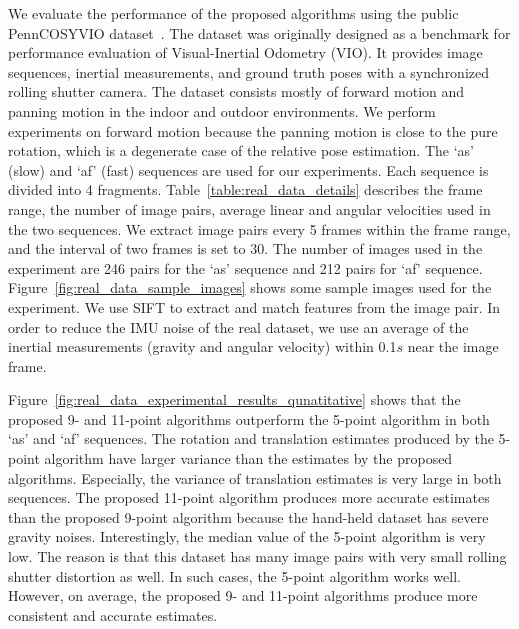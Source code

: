 \documentclass[10pt,twocolumn,letterpaper]{article}
\theoremstyle{definition}
\begin{document}
	
	
	We evaluate the performance of the proposed algorithms using the public PennCOSYVIO dataset~\cite{Pfrommer:ICRA:2017}.
	The dataset was originally designed as a benchmark for performance evaluation of Visual-Inertial Odometry (VIO). 
	It provides image sequences, inertial measurements, and ground truth poses with a synchronized rolling shutter camera.
	The dataset consists mostly of forward motion and panning motion in the indoor and outdoor environments. 
	We perform experiments on forward motion because the panning motion is close to the pure rotation, which is a degenerate case of the relative pose estimation.
	The `as' (slow) and `af' (fast) sequences are used for our experiments.
	Each sequence is divided into 4 fragments.
	Table~\ref{table:real_data_details} describes the frame range, the number of image pairs, average linear and angular velocities used in the two sequences.	
	We extract image pairs every 5 frames within the frame range, and the interval of two frames is set to 30. 
	The number of images used in the experiment are 246 pairs for the `as' sequence and 212 pairs for `af' sequence.
	Figure~\ref{fig:real_data_sample_images} shows some sample images used for the experiment.		
	We use SIFT to extract and match features from the image pair.
	In order to reduce the IMU noise of the real dataset, we use an average of the inertial measurements (gravity and angular velocity) within 0.1$s$ near the image frame.
	
	
	
	Figure~\ref{fig:real_data_experimental_results_qunatitative} shows that the proposed 9- and 11-point algorithms outperform the 5-point algorithm in both `as' and `af' sequences.
	The rotation and translation estimates produced by the 5-point algorithm have larger variance than the estimates by the proposed algorithms.
	Especially, the variance of translation estimates is very large in both sequences. 
	The proposed 11-point algorithm produces more accurate estimates than the proposed 9-point algorithm because the hand-held dataset has severe gravity noises.
	Interestingly, the median value of the 5-point algorithm is very low.
	The reason is that this dataset has many image pairs with very small rolling shutter distortion as well.  	
	In such cases, the 5-point algorithm works well. 
	However, on average, the proposed 9- and 11-point algorithms produce more consistent and accurate estimates.
	
	
	
\end{document}
